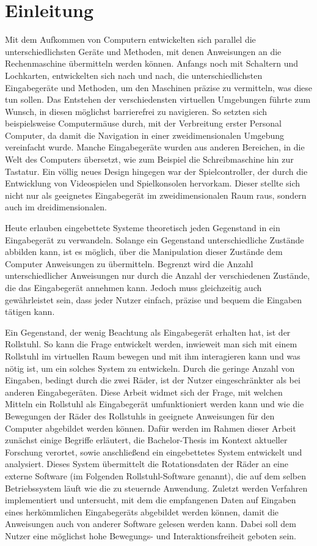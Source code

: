 \chapter{Einleitung}
Mit dem Aufkommen von Computern entwickelten sich parallel die unterschiedlichsten Geräte und Methoden, mit denen Anweisungen an die Rechenmaschine übermitteln werden können.
Anfangs noch mit Schaltern und Lochkarten, entwickelten sich nach und nach, die unterschiedlichsten Eingabegeräte und Methoden, um den Maschinen präzise zu vermitteln, was diese tun sollen.
Das Entstehen der verschiedensten virtuellen Umgebungen führte zum Wunsch, in diesen möglichst barrierefrei zu navigieren.
So setzten sich beispielsweise Computermäuse durch, mit der Verbreitung erster Personal Computer, da damit die Navigation in einer zweidimensionalen Umgebung vereinfacht wurde.
Manche Eingabegeräte wurden aus anderen Bereichen, in die Welt des Computers übersetzt, wie zum Beispiel die Schreibmaschine hin zur Tastatur.
Ein völlig neues Design hingegen war der Spielcontroller, der durch die Entwicklung von Videospielen und Spielkonsolen hervorkam.
Dieser stellte sich nicht nur als geeignetes Eingabegerät im zweidimensionalen Raum raus, sondern auch im dreidimensionalen.

Heute erlauben eingebettete Systeme theoretisch jeden Gegenstand in ein Eingabegerät zu verwandeln.
Solange ein Gegenstand unterschiedliche Zustände abbilden kann, ist es möglich, über die Manipulation dieser Zustände dem Computer Anweisungen zu übermitteln.
Begrenzt wird die Anzahl unterschiedlicher Anweisungen nur durch die Anzahl der verschiedenen Zustände, die das Eingabegerät annehmen kann.
Jedoch muss gleichzeitig auch gewährleistet sein, dass jeder Nutzer einfach, präzise und bequem die Eingaben tätigen kann.

Ein Gegenstand, der wenig Beachtung als Eingabegerät erhalten hat, ist der Rollstuhl.
So kann die Frage entwickelt werden, inwieweit man sich mit einem Rollstuhl im virtuellen Raum bewegen und mit ihm interagieren kann und was nötig ist, um ein solches System zu entwickeln.
Durch die geringe Anzahl von Eingaben, bedingt durch die zwei Räder, ist der Nutzer eingeschränkter als bei anderen Eingabegeräten.
Diese Arbeit widmet sich der Frage, mit welchen Mitteln ein Rollstuhl als Eingabegerät umfunktioniert werden kann und wie die Bewegungen der Räder des Rollstuhls in geeignete Anweisungen für den Computer abgebildet werden können.
Dafür werden im Rahmen dieser Arbeit zunächst einige Begriffe erläutert, die Bachelor-Thesis im Kontext aktueller Forschung verortet, sowie anschließend ein eingebettetes System entwickelt und analysiert.
Dieses System übermittelt die Rotationsdaten der Räder an eine externe Software (im Folgenden Rollstuhl-Software genannt), die auf dem selben Betriebssystem läuft wie die zu steuernde Anwendung.
Zuletzt werden Verfahren implementiert und untersucht, mit dem die empfangenen Daten auf Eingaben eines herkömmlichen Eingabegeräts abgebildet werden können, damit die Anweisungen auch von anderer Software gelesen werden kann.
Dabei soll dem Nutzer eine möglichst hohe Bewegungs- und Interaktionsfreiheit geboten sein.